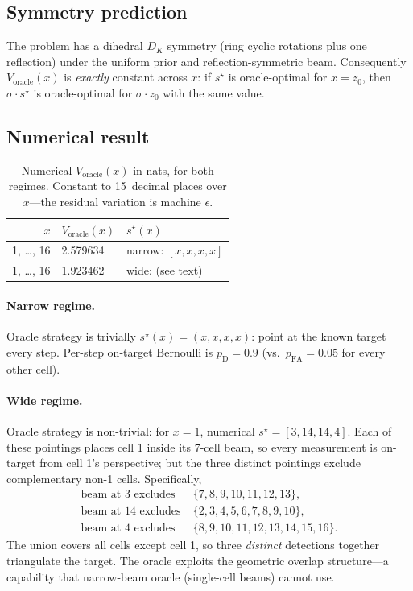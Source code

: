 \documentclass[11pt,a4paper]{article}
\begin{document}
\subsection{Symmetry prediction}
The problem has a dihedral $D_K$ symmetry (ring cyclic rotations plus one reflection) under the uniform prior and reflection-symmetric beam.  Consequently $V_{\text{oracle}}(x)$ is \emph{exactly} constant across $x$: if $s^\star$ is oracle-optimal for $x = z_0$, then $\sigma \cdot s^\star$ is oracle-optimal for $\sigma \cdot z_0$ with the same value.

\subsection{Numerical result}

\begin{table}[h!]
\centering
\begin{tabular}{@{}rll@{}}
\toprule
$x$ & $V_{\text{oracle}}(x)$ & $s^\star(x)$ \\
\midrule
1, \ldots, 16 & 2.579634 & narrow: $[x, x, x, x]$ \\
1, \ldots, 16 & 1.923462 & wide:  (see text)        \\
\bottomrule
\end{tabular}
\caption{Numerical $V_{\text{oracle}}(x)$ in nats, for both regimes.  Constant to 15~decimal places over $x$---the residual variation is machine $\epsilon$.}
\label{tab:Voracle}
\end{table}

\paragraph{Narrow regime.}  Oracle strategy is trivially $s^\star(x) = (x, x, x, x)$: point at the known target every step.  Per-step on-target Bernoulli is $p_{\mathrm{D}} = 0.9$ (vs.\ $p_{\mathrm{FA}} = 0.05$ for every other cell).

\paragraph{Wide regime.}  Oracle strategy is non-trivial: for $x = 1$, numerical $s^\star = [3, 14, 14, 4]$.  Each of these pointings places cell 1 inside its 7-cell beam, so every measurement is on-target from cell 1's perspective; but the three distinct pointings exclude complementary non-1 cells.  Specifically,
\[
  \begin{aligned}
    \text{beam at 3 excludes}  &\; \{7, 8, 9, 10, 11, 12, 13\}, \\
    \text{beam at 14 excludes} &\; \{2, 3, 4, 5, 6, 7, 8, 9, 10\}, \\
    \text{beam at 4 excludes}  &\; \{8, 9, 10, 11, 12, 13, 14, 15, 16\}.
  \end{aligned}
\]
The union covers all cells except cell 1, so three \emph{distinct} detections together triangulate the target.  The oracle exploits the geometric overlap structure---a capability that narrow-beam oracle (single-cell beams) cannot use.
\end{document}
